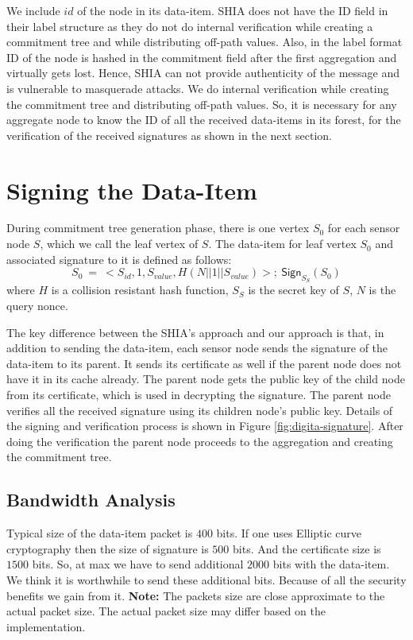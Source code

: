 	We include $id$ of the node in its data-item.
	SHIA does not have the ID field in their label structure as they do not do internal verification while creating a commitment tree and while distributing off-path values.
	Also, in the label format ID of the node is hashed in the commitment field after the first aggregation and virtually gets lost.
	Hence, SHIA can not provide authenticity of the message and is vulnerable to masquerade attacks.
	We do internal verification while creating the commitment tree and distributing off-path values.
	So, it is necessary for any aggregate node to know the ID of all the received data-items in its forest, for the verification of the received signatures as shown in the next section.

\section{Signing the Data-Item}
	During commitment tree generation phase, there is one vertex $S_{0}$ for each sensor node $S$, which we call the leaf vertex of $S$.
	The data-item for leaf vertex $S_{0}$ and associated signature to it is defined as follows:
	\begin{equation}
		\label{eq:leaf-vertex}
		S_{0}\ =\ <S_{id}, 1, S_{value}, H(N||1||S_{value})>;\ 	\textsf{Sign}_{S_{S}}(S_{0})
	\end{equation}
	where $H$ is a collision resistant hash function, $S_{S}$ is the secret key of $S$, $N$ is the query nonce.

	The key difference between the SHIA's approach and our approach is that, in addition to sending the data-item, each sensor node sends the signature of the data-item to its parent.
	It sends its certificate as well if the parent node does not have it in its cache  already.
	The parent node gets the public key of the child node from its certificate, which is used in decrypting the signature. 
	The parent node verifies all the received signature using its children node's public key.
	Details of the signing and verification process is shown in Figure \ref{fig:digita-signature}.
	After doing the verification the parent node proceeds to the aggregation and creating the commitment tree.
	
	\subsection{Bandwidth Analysis}

	Typical size of the data-item packet is $400$ bits.
	If one uses Elliptic curve cryptography then the size of signature is $500$ bits.
	And the certificate size is $1500$ bits.
	So, at max we have to send additional $2000$ bits with the data-item.
	We think it is worthwhile to send these additional bits.
	Because of all the security benefits we gain from it. 
	\textbf{Note:} The packets size are close approximate to the actual packet size. 
	The actual packet size may differ based on the implementation.
